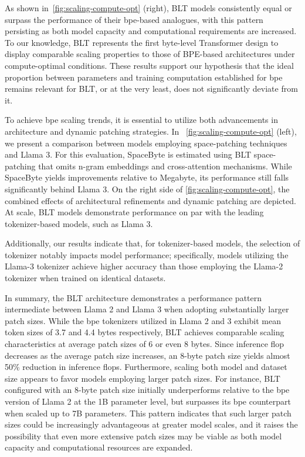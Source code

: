 As shown in~\autoref{fig:scaling-compute-opt} (right), {\textsc BLT} models consistently equal or surpass the performance of their bpe-based analogues, with this pattern persisting as both model capacity and computational requirements are increased. To our knowledge, {\textsc BLT} represents the first byte-level Transformer design to display comparable scaling properties to those of BPE-based architectures under compute-optimal conditions. These results support our hypothesis that the ideal proportion between parameters and training computation established for bpe remains relevant for {\textsc BLT}, or at the very least, does not significantly deviate from it.

To achieve bpe scaling trends, it is essential to utilize both advancements in architecture and dynamic patching strategies. In ~\autoref{fig:scaling-compute-opt} (left), we present a comparison between models employing space-patching techniques and Llama 3. For this evaluation, SpaceByte \citep{slagle2024spacebyte} is estimated using {\textsc BLT} space-patching that omits n-gram embeddings and cross-attention mechanisms. While SpaceByte yields improvements relative to Megabyte, its performance still falls significantly behind Llama 3. On the right side of \autoref{fig:scaling-compute-opt}, the combined effects of architectural refinements and dynamic patching are depicted. At scale, {\textsc BLT} models demonstrate performance on par with the leading tokenizer-based models, such as Llama 3.

Additionally, our results indicate that, for tokenizer-based models, the selection of tokenizer notably impacts model performance; specifically, models utilizing the Llama-3 tokenizer achieve higher accuracy than those employing the Llama-2 tokenizer when trained on identical datasets.

In summary, the {\textsc BLT} architecture demonstrates a performance pattern intermediate between Llama 2 and Llama 3 when adopting substantially larger patch sizes. While the bpe tokenizers utilized in Llama 2 and 3 exhibit mean token sizes of 3.7 and 4.4 bytes respectively, {\textsc BLT} achieves comparable scaling characteristics at average patch sizes of 6 or even 8 bytes. Since inference flop decreases as the average patch size increases, an 8-byte patch size yields almost 50\% reduction in inference flops. Furthermore, scaling both model and dataset size appears to favor models employing larger patch sizes. For instance, {\textsc BLT} configured with an 8-byte patch size initially underperforms relative to the bpe version of Llama 2 at the 1B parameter level, but surpasses its bpe counterpart when scaled up to 7B parameters. This pattern indicates that such larger patch sizes could be increasingly advantageous at greater model scales, and it raises the possibility that even more extensive patch sizes may be viable as both model capacity and computational resources are expanded.

